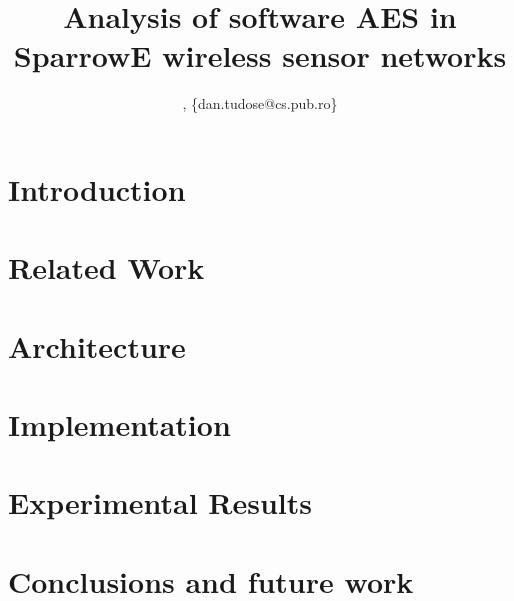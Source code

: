 \documentclass[conference]{IEEEtran}
\begin{document}
\title{Analysis of software AES in SparrowE wireless sensor networks}

\author{
, \{dan.tudose@cs.pub.ro\}
}

\maketitle

\begin{abstract} 

\end{abstract}

\section{Introduction}
\label{sec:introduction}


\section{Related Work}
\label{sec:related}


\section{Architecture}
\label{sec:architecture}


\section{Implementation}
\label{sec:implementation}


\section{Experimental Results}
\label{sec:results}


\section{Conclusions and future work}
\label{sec:conclusions}




\end{document}
